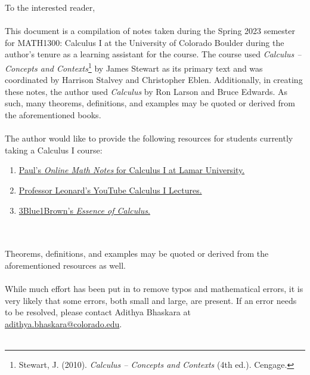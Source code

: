 To the interested reader,
\\
\\
This document is a compilation of notes taken during the Spring 2023 semester for MATH1300: Calculus I at the University of Colorado Boulder during the author's tenure as a learning assistant for the course. The course used \textit{Calculus -- Concepts and Contexts}\footnote{Stewart, J. (2010). \textit{Calculus -- Concepts and Contexts} (4th ed.). Cengage.} by James Stewart as its primary text and was coordinated by Harrison Stalvey and Christopher Eblen. Additionally, in creating these notes, the author used \textit{Calculus} by Ron Larson and Bruce Edwards. As such, many theorems, definitions, and examples may be quoted or derived from the aforementioned books.
\\
\\
The author would like to provide the following resources for students currently taking a Calculus I course:
\begin{enumerate}
    \item \href{https://tutorial.math.lamar.edu/classes/calci/calci.aspx}{Paul's \textit{Online Math Notes} for Calculus I at Lamar University.}
    \item \href{https://youtube.com/playlist?list=PLF797E961509B4EB5}{Professor Leonard's YouTube Calculus I Lectures.}
    \item \href{https://www.youtube.com/watch?v=WUvTyaaNkzM&list=PLZHQObOWTQDMsr9K-rj53DwVRMYO3t5Yr}{3Blue1Brown's \textit{Essence of Calculus}.}
\end{enumerate}
\vphantom
\\
\\
Theorems, definitions, and examples may be quoted or derived from the aforementioned resources as well.
\\
\\
While much effort has been put in to remove typos and mathematical errors, it is very likely that some errors, both small and large, are present. If an error needs to be resolved, please contact Adithya Bhaskara at \href{mailto:adithya.bhaskara@colorado.edu}{adithya.bhaskara@colorado.edu}.
\\
\\
\vfill
{}